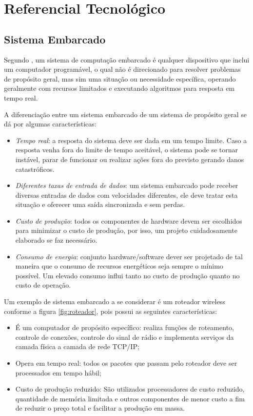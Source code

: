 ﻿\chapter{Referencial Tecnol\'{o}gico}
\label{cap:referencial tecnologico}


\section{Sistema Embarcado}

Segundo \textcite{Wolf:2001}, um sistema de computação embarcado é qualquer dispositivo que inclui um computador programável, o qual não é direcionado para resolver problemas de propósito geral, mas sim uma situação ou necessidade específica, operando geralmente com recursos limitados e executando algoritmos para resposta em tempo real.

A diferenciação entre um sistema embarcado de um sistema de propósito geral se dá por algumas características:
\begin{itemize}
	\item \emph{Tempo real}: a resposta do sistema deve ser dada em um tempo limite. Caso a resposta venha fora do limite de tempo aceitável, o sistema pode se tornar instável, parar de funcionar ou realizar ações fora do previsto gerando danos catastróficos. 
	\item \emph{Diferentes taxas de entrada de dados}: um sistema embarcado pode receber diversas entradas de dados com velocidades diferentes, ele deve tratar esta situação e oferecer uma saída sincronizada e sem perdas.
	\item \emph{Custo de produção}: todos os componentes de hardware devem ser escolhidos para minimizar o custo de produção, por isso, um projeto cuidadosamente elaborado se faz necessário.
	\item \emph{Consumo de energia}: conjunto hardware/software dever ser projetado de tal maneira que o consumo de recursos energéticos seja sempre o mínimo possível. Um elevado consumo influi tanto no custo de produção  quanto no custo de operação.
\end{itemize}

Um exemplo de sistema embarcado a se considerar é um roteador wireless conforme a figura \ref{fig:roteador}, pois possui as seguintes características:

\begin{itemize}
	\item É um computador de propósito específico: realiza funções de roteamento, controle de conexões, controle do sinal de rádio e implementa serviços da camada física a camada de rede TCP/IP;
	\item Opera em tempo real: todos os pacotes que passam pelo roteador deve ser processados em tempo hábil;
	\item Custo de produção reduzido: São utilizados processadores de custo reduzido, quantidade de memória limitada e outros componentes de menor custo a fim de reduzir o preço total e facilitar a produção em massa.
\end{itemize}


